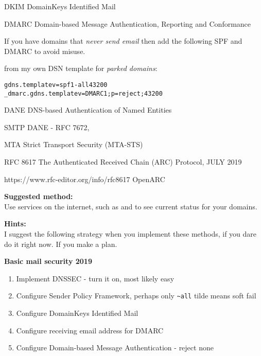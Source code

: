 \documentclass[Screen16to9,17pt]{foils}
\begin{document}

 DKIM DomainKeys Identified Mail\\
 {\footnotesize{}}



%

DMARC Domain-based Message Authentication, Reporting and Conformance\\
{\footnotesize{}}


If you have domains that \emph{never send email} then add the following SPF and DMARC to avoid misuse.

from my own DSN template for \emph{parked domains}:
\begin{alltt}
gdns.template   v=spf1 -all     43200
_dmarc.gdns.template    v=DMARC1; p=reject;     43200
\end{alltt}


 DANE DNS-based Authentication of Named Entities\\ {\footnotesize{}}

SMTP DANE - RFC 7672,


MTA Strict Transport Security (MTA-STS)

RFC 8617
The Authenticated Received Chain (ARC) Protocol, JULY 2019

https://www.rfc-editor.org/info/rfc8617
OpenARC


{\bf Suggested method:}\\
Use services on the internet, such as  and  to see current status for your domains.

{\bf Hints:}\\
I suggest the following strategy when you implement these methods, if you dare do it right now. If you make a plan.

{\bf Basic mail security 2019}
\begin{enumerate}
\item Implement DNSSEC - turn it on, most likely easy
\item Configure Sender Policy Framework, perhaps only \verb+~all+ tilde means soft fail
\item Configure DomainKeys Identified Mail
\item Configure receiving email address for DMARC
\item Configure Domain-based Message Authentication - reject none
\end{enumerate}
\end{document}
